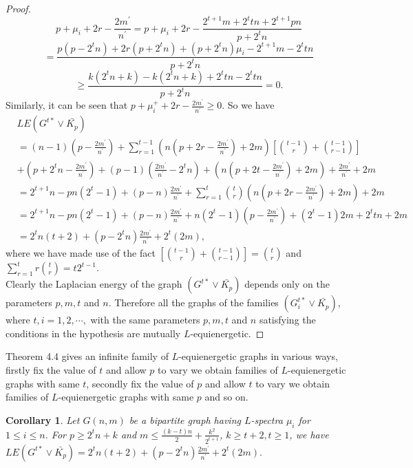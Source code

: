 \documentclass[12pt,a4paper]{amsart}
\newtheorem{corollary}[theorem]{Corollary}
\theoremstyle{theorem}
\theoremstyle{definition}
\numberwithin{equation}{section} \makeatletter
\begin{document}
\begin{proof}
 $$p+\mu_i+2r-\frac{2m^{\prime}}{n^{\prime}}=p+\mu_i+2r-\frac{2^{t+1}m+2^ttn+2^{t+1}pn}{p+2^tn}$$
 $$= \frac{p(p-2^tn)+2r(p+2^tn)+(p+2^tn)\mu_i-2^{t+1}m-2^ttn}{p+2^tn}$$ $$\geq \frac{k(2^tn+k)-k(2^tn+k)+2^ttn-2^ttn}{p+2^tn}=0.$$
Similarly, it can be seen that   $p+\mu_i^{+}+2r-\frac{2m^{\prime}}{n^{\prime}}\geq 0.$
So we have
\begin{align*}
&LE(G^{t*}\vee \bar{K_p})\\&=(n-1)(p-\frac{2m^{\prime}}{n^{\prime}})+\sum\limits_{r=1}^{t-1}\left(n(p+2r-\frac{2m^{\prime}}{n^{\prime}} )+2m \right)\left[{t-1 \choose r}+{t-1 \choose r-1} \right]\\&+(p+2^tn-\frac{2m^{\prime}}{n^{\prime}})+(p-1)(\frac{2m^{\prime}}{n^{\prime}}-2^tn)+\left (n(p+2t-\frac{2m^{\prime}}{n^{\prime}})+2m \right)+\frac{2m^{\prime}}{n^{\prime}}+2m\\&
=2^{t+1}n-pn(2^t-1)+(p-n)\frac{2m^{\prime}}{n^{\prime}}+\sum\limits_{r=1}^{t}{t \choose r}\left(n(p+2r-\frac{2m^{\prime}}{n^{\prime}})+2m \right)+2m\\&
=2^{t+1}n-pn(2^t-1)+(p-n)\frac{2m^{\prime}}{n^{\prime}}+n(2^t-1)(p-\frac{2m^{\prime}}{n^{\prime}})+(2^t-1)2m+2^ttn+2m\\&=2^tn(t+2)+(p-2^tn)\frac{2m^{\prime}}{n^{\prime}}+2^t(2m),
\end{align*}
where we have made use of the fact $\left[{t-1 \choose r}+{t-1 \choose r-1} \right]={t \choose r}$ and $\sum\limits_{r=1}^{t}r{t \choose r}=t2^{t-1}.$\\
\indent Clearly the Laplacian energy of the graph $(G^{t*}\vee \bar{K_p})$ depends only on the parameters $p, m, t$ and $n$. Therefore all the graphs of the families $(G_i^{t*}\vee \bar{K_p})$, where $t,i=1,2,\cdots,$ with the same parameters $p, m, t$ and $n$ satisfying the conditions in the hypothesis are mutually $L$-equienergetic.
 \end{proof}
 \indent Theorem 4.4 gives an infinite family of $L$-equienergetic graphs in various ways, firstly fix the value of $t$ and allow $p$ to vary we obtain families of $L$-equienergetic graphs with same $t$, secondly fix the value of $p$ and allow $t$ to vary we obtain families of $L$-equienergetic graphs with same $p$ and so on.
 \begin{corollary}
 Let $G(n,m)$ be a bipartite graph having $L$-spectra $\mu_i$ for $1\leq i\leq n $. For $p\geq 2^tn+k$ and $m\leq \frac{(k-t)n}{2}+\frac{k^2}{2^{t+1}}$, $k\geq t+2, t\geq 1$, we have $LE(G^{t*}\vee \bar{K_p})=2^tn(t+2)+(p-2^tn)\frac{2m^{\prime}}{n^{\prime}}+2^t(2m).$
 \end{corollary}
\end{document}
